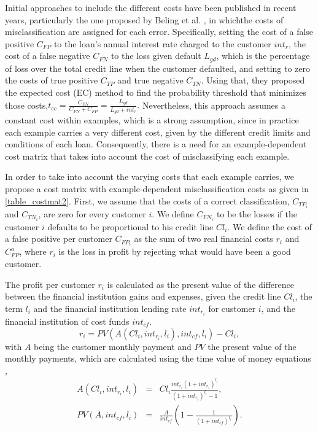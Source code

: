   Initial approaches to include the different costs have been published in recent years, 
  particularly the one proposed by Beling et al. \citep{Beling2005,Oliver2009}, in whichthe costs 
of 
  misclassification are assigned for each error. Specifically, setting the cost of a false positive 
  $C_{FP}$ to the loan's annual interest rate charged to the customer $int_r$, the cost of a false 
  negative $C_{FN}$ to the loss given default $L_{gd}$, which is the percentage of loss over the 
  total credit line when the customer defaulted, and setting to zero the costs of true positive 
  $C_{TP}$ and true negative $C_{TN}$. Using that, they proposed the expected cost (EC) method to 
  find the probability threshold that minimizes those costs,$t_{ec}= \frac{C_{FN}}{C_{FN}+C_{FP}} 
  =\frac{L_{gd}}{L_{gd}+int_r}.$ Nevertheless, this approach assumes a constant cost within 
  examples, which is a strong assumption, since in practice each example carries a very 
  different cost, given by the different credit limits and conditions of each loan. Consequently, 
  there is a need for an example-dependent cost matrix that takes into account the cost of 
  misclassifying each example.
   
  In order to take into account the varying costs that each example carries, we propose a cost 
  matrix with example-dependent misclassification costs as given in \tablename{ 
  \ref{table_costmat2}}. First, we assume that the costs of a correct classification, $C_{TP_i}$ 
  and $C_{TN_i}$, are zero for every customer $i$. We define $C_{FN_i}$ to be the losses if the 
  customer $i$ defaults to be proportional to his credit line $Cl_i$. We define the cost of a false 
  positive per customer $C_{FP_i}$ as the sum of two real financial costs $r_i$ and $C^a_{FP}$,
  where $r_i$ is the loss in profit by rejecting what would have been a good customer. 
  
  The profit per customer $r_i$ is calculated as the present value of the difference between the 
  financial institution gains and expenses, given the credit line $Cl_i$, the term $l_i$ and the 
  financial institution lending rate $int_{r_i}$ for customer $i$, and the financial institution 
  of cost funds $int_{cf}$.
  \begin{equation}
    r_i= PV(A(Cl_i,int_{r_i},l_i),int_{cf},l_i)-Cl_i,
  \end{equation}
  with $A$ being the customer monthly payment and $PV$ the present value of the monthly payments,
  which are calculated using the time value of money equations \citep{Lawrence2012},
  \begin{eqnarray}
    A(Cl_i,int_{r_i},l_i) &=&  Cl_i \frac{int_{r_i}(1+int_{r_i})^{l_i}}{(1+int_{r_i})^{l_i}-1}, \\
    PV(A,int_{cf},l_i) &=& \frac{A}{int_{cf}} \left(1-\frac{1}{(1+int_{cf})^{l_i}} \right).
  \end{eqnarray}
    
